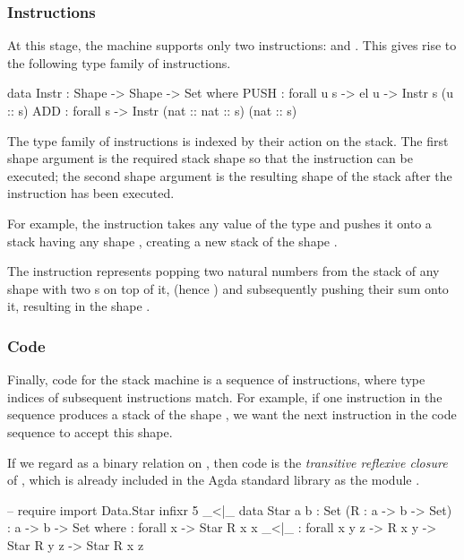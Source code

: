 \subsubsection{Instructions}

At this stage, the machine supports only two instructions: 
and . This gives rise to the following type family of instructions.
\begin{code}
  data Instr : Shape -> Shape -> Set where
    PUSH : forall {u s} -> el u -> Instr s (u :: s)
    ADD : forall {s} -> Instr (nat :: nat :: s) (nat :: s)
\end{code}
The type family of instructions is indexed by their action on the stack. The first shape
argument is the required stack shape so that the instruction can be executed;
the second shape argument is the resulting shape of the stack after the
instruction has been executed.

For example, the instruction  takes any value of the type 
and pushes it onto a stack having any shape , creating a new
stack of the shape .

The instruction  represents popping two natural numbers from the
stack of any shape with two s on top of it, (hence
)
and subsequently pushing their sum onto it, resulting in the shape
.

\subsubsection{Code}

Finally, code for the stack machine is a sequence of instructions, where
type indices of subsequent instructions match. For example, if one instruction
in the sequence produces a stack of the shape ,
we want the next instruction in the code sequence to accept this shape.

If we regard
as a binary relation on , then code is the \emph{transitive reflexive closure}
of , which is already included in the Agda standard library as the
module .

\begin{code}
  -- require import Data.Star
  infixr 5 _<|\_
  data Star {a b : Set} (R : a -> b -> Set) : a -> b -> Set where
    \nil : forall {x} -> Star R x x
    _<|\_ : forall {x y z} -> R x y -> Star R y z -> Star R x z
\end{code}

